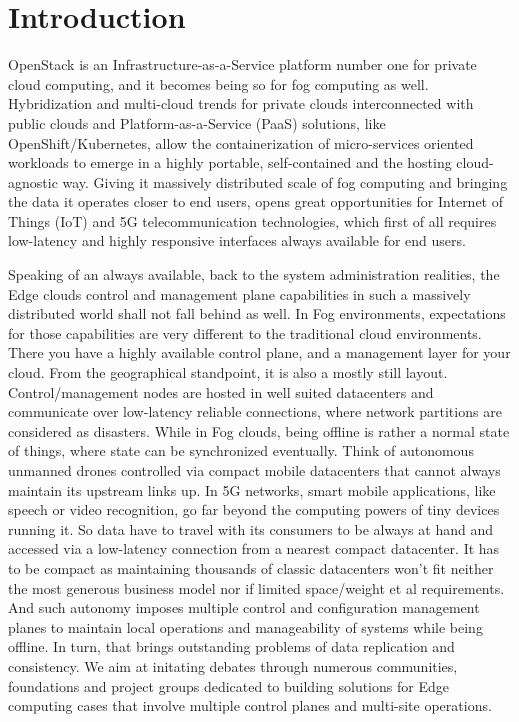 \documentclass[conference]{IEEEtran}
\begin{document}
\section{Introduction}
OpenStack is an Infrastructure-as-a-Service platform number one for private
cloud computing, and it becomes being so for fog computing as well.
Hybridization and multi-cloud trends for private clouds interconnected with
public clouds and Platform-as-a-Service (PaaS) solutions, like
OpenShift/Kubernetes, allow the containerization of micro-services oriented
workloads to emerge in a highly portable, self-contained and the hosting
cloud-agnostic way. Giving it massively distributed scale of fog computing and
bringing the data it operates closer to end users, opens great opportunities
for Internet of Things (IoT) and 5G telecommunication technologies,
which first of all requires low-latency and highly responsive interfaces always
available for end users.

Speaking of an always available, back to the system administration realities,
the Edge clouds control and management plane capabilities in such a massively
distributed world shall not fall behind as well. In Fog environments,
expectations for those capabilities are very different to the traditional cloud
environments. There you have a highly available control plane, and a management
layer for your cloud. From the geographical standpoint, it is also a mostly
still layout. Control/management nodes are hosted in well suited datacenters
and communicate over low-latency reliable connections, where network partitions
are considered as disasters. While in Fog clouds, being offline is rather a
normal state of things, where state can be synchronized eventually. Think of
autonomous unmanned drones controlled via compact mobile datacenters that
cannot always maintain its upstream links up. In 5G networks, smart mobile
applications, like speech or video recognition, go far beyond the computing
powers of tiny devices running it. So data have to travel with its consumers to
be always at hand and accessed via a low-latency connection from a nearest
compact datacenter. It has to be compact as maintaining thousands of classic
datacenters won't fit neither the most generous business model nor if limited
space/weight et al requirements. And such autonomy imposes multiple control and
configuration management planes to maintain local operations and manageability
of systems while being offline. In turn, that brings outstanding problems of
data replication and consistency. We aim at initating debates through numerous
communities, foundations and project groups dedicated to building solutions
for Edge computing cases that involve multiple control planes and multi-site
operations.
\end{document}
